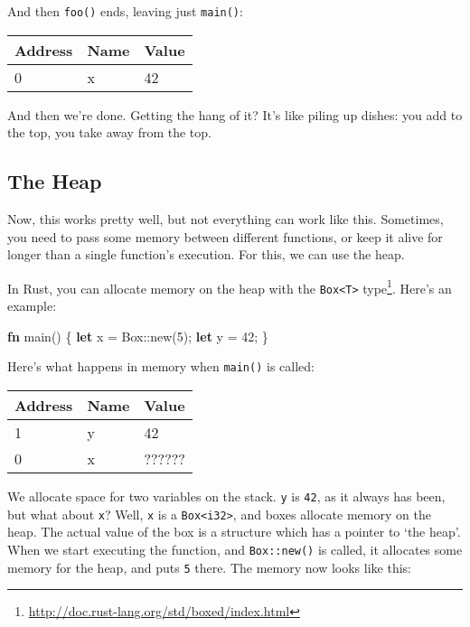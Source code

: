 \documentclass[a4paper,]{book}
\newenvironment{Shaded}{\begin{snugshade}}{\end{snugshade}}
\newcommand{\KeywordTok}[1]{\textcolor[rgb]{0.13,0.29,0.53}{\textbf{{#1}}}}
\newcommand{\DataTypeTok}[1]{\textcolor[rgb]{0.13,0.29,0.53}{{#1}}}
\newcommand{\DecValTok}[1]{\textcolor[rgb]{0.00,0.00,0.81}{{#1}}}
\newcommand{\NormalTok}[1]{{#1}}
\renewcommand{\href}[2]{#2\footnote{\url{#1}}}
\begin{document}
And then \texttt{foo()} ends, leaving just \texttt{main()}:

\begin{longtable}[c]{@{}lll@{}}
\toprule
Address & Name & Value\tabularnewline
\midrule
\endhead
0 & x & 42\tabularnewline
\bottomrule
\end{longtable}

And then we're done. Getting the hang of it? It's like piling up dishes:
you add to the top, you take away from the top.

\subsection{The Heap}\label{the-heap}

Now, this works pretty well, but not everything can work like this.
Sometimes, you need to pass some memory between different functions, or
keep it alive for longer than a single function's execution. For this,
we can use the heap.

In Rust, you can allocate memory on the heap with the
\href{http://doc.rust-lang.org/std/boxed/index.html}{\texttt{Box\textless{}T\textgreater{}}
type}. Here's an example:

\begin{Shaded}
\begin{Highlighting}[]
\KeywordTok{fn} \NormalTok{main() \{}
    \KeywordTok{let} \NormalTok{x = }\DataTypeTok{Box}\NormalTok{::new(}\DecValTok{5}\NormalTok{);}
    \KeywordTok{let} \NormalTok{y = }\DecValTok{42}\NormalTok{;}
\NormalTok{\}}
\end{Highlighting}
\end{Shaded}

Here's what happens in memory when \texttt{main()} is called:

\begin{longtable}[c]{@{}lll@{}}
\toprule
Address & Name & Value\tabularnewline
\midrule
\endhead
1 & y & 42\tabularnewline
0 & x & ??????\tabularnewline
\bottomrule
\end{longtable}

We allocate space for two variables on the stack. \texttt{y} is
\texttt{42}, as it always has been, but what about \texttt{x}? Well,
\texttt{x} is a \texttt{Box\textless{}i32\textgreater{}}, and boxes
allocate memory on the heap. The actual value of the box is a structure
which has a pointer to `the heap'. When we start executing the function,
and \texttt{Box::new()} is called, it allocates some memory for the
heap, and puts \texttt{5} there. The memory now looks like this:
\end{document}
